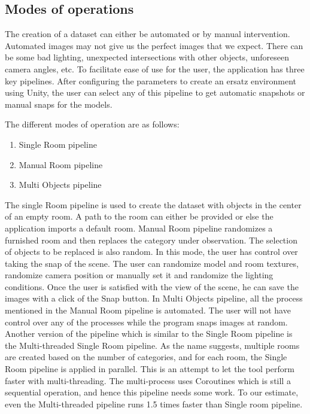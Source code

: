 \subsection{Modes of operations}\label{subsec:modes-of-operations}
The creation of a dataset can either be automated or by manual intervention.
Automated images may not give us the perfect images that we expect.
There can be some bad lighting, unexpected intersections with other objects, unforeseen camera angles, etc.
To facilitate ease of use for the user, the application has three key pipelines.
After configuring the parameters to create an ersatz environment using Unity,
the user can select any of this pipeline to get automatic snapshots or manual snaps for the models.

The different modes of operation are as follows:
\begin{enumerate}
    \item Single Room pipeline
    \item Manual Room pipeline
    \item Multi Objects pipeline
\end{enumerate}

The single Room pipeline is used to create the dataset with objects in the center of an empty room.
A path to the room can either be provided or else the application imports a default room.
Manual Room pipeline randomizes a furnished room and then replaces the category under observation.
The selection of objects to be replaced is also random.
In this mode, the user has control over taking the snap of the scene.
The user can randomize model and room textures, randomize camera position or manually set it and randomize the lighting conditions.
Once the user is satisfied with the view of the scene, he can save the images with a click of the Snap button.
In Multi Objects pipeline, all the process mentioned in the Manual Room pipeline is automated.
The user will not have control over any of the processes while the program snaps images at random.
Another version of the pipeline which is similar to the Single Room pipeline is the Multi-threaded Single Room pipeline.
As the name suggests, multiple rooms are created based on the number of categories, and for each room, the Single Room pipeline is applied in parallel.
This is an attempt to let the tool perform faster with multi-threading.
The multi-process uses Coroutines which is still a sequential operation, and hence this pipeline needs some work.
To our estimate, even the Multi-threaded pipeline runs 1.5 times faster than Single room pipeline.


